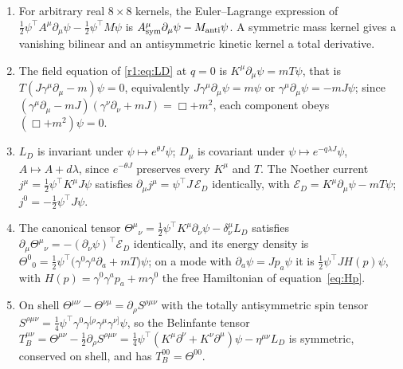 \begin{proposition}
\label{r1:prop:dirac}
\begin{enumerate}[label=(\roman*),leftmargin=2.2em]
\item For arbitrary real $8\times8$ kernels, the Euler--Lagrange expression of $\tfrac12\psi^{\!\top}A^\mu\partial_\mu\psi-\tfrac12\psi^{\!\top}M\psi$
is $A^\mu_{\rm sym}\partial_\mu\psi-M_{\rm anti}\psi$. A symmetric mass kernel gives a vanishing bilinear and an antisymmetric kinetic
kernel a total derivative.
\item The field equation of \eqref{r1:eq:LD} at $q=0$ is $K^\mu\partial_\mu\psi=mT\psi$, that is $T(J\gamma^\mu\partial_\mu-m)\psi=0$,
equivalently $J\gamma^\mu\partial_\mu\psi=m\psi$ or $\gamma^\mu\partial_\mu\psi=-mJ\psi$; since
$(\gamma^\mu\partial_\mu-mJ)(\gamma^\nu\partial_\nu+mJ)=\Box+m^2$, each component obeys $(\Box+m^2)\psi=0$.
\item $L_D$ is invariant under $\psi\mapsto e^{\theta J}\psi$; $D_\mu$ is covariant under $\psi\mapsto e^{-q\lambda J}\psi$,
$A\mapsto A+d\lambda$, since $e^{-\theta J}$ preserves every $K^\mu$ and $T$. The Noether current $j^\mu=\tfrac12\psi^{\!\top}K^\mu J\psi$
satisfies $\partial_\mu j^\mu=\psi^{\!\top}J\,\mathcal E_D$ identically, with $\mathcal E_D=K^\mu\partial_\mu\psi-mT\psi$; $j^0=-\tfrac12\psi^{\!\top}J\psi$.
\item The canonical tensor $\Theta^\mu{}_\nu=\tfrac12\psi^{\!\top}K^\mu\partial_\nu\psi-\delta^\mu_\nu L_D$ satisfies
$\partial_\mu\Theta^\mu{}_\nu=-(\partial_\nu\psi)^{\!\top}\mathcal E_D$ identically, and its energy density is
$\Theta^0{}_0=\tfrac12\psi^{\!\top}\bigl(\gamma^0\gamma^a\partial_a+mT\bigr)\psi$; on a mode with $\partial_a\psi=Jp_a\psi$ it is
$\tfrac12\psi^{\!\top}JH(p)\psi$, with $H(p)=\gamma^0\gamma^ap_a+m\gamma^0$ the free Hamiltonian of equation~\cref{eq:Hp}.
\item On shell $\Theta^{\mu\nu}-\Theta^{\nu\mu}=\partial_\rho S^{\rho\mu\nu}$ with the totally antisymmetric spin tensor
$S^{\rho\mu\nu}=\tfrac14\psi^{\!\top}\gamma^0\gamma^{[\rho}\gamma^\mu\gamma^{\nu]}\psi$, so the Belinfante tensor
$T_B^{\mu\nu}=\Theta^{\mu\nu}-\tfrac12\partial_\rho S^{\rho\mu\nu}=\tfrac14\psi^{\!\top}(K^\mu\partial^\nu+K^\nu\partial^\mu)\psi-\eta^{\mu\nu}L_D$ is
symmetric, conserved on shell, and has $T_B^{00}=\Theta^{00}$.
\end{enumerate}
\end{proposition}

